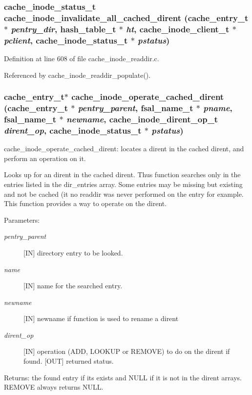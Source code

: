 \subsubsection{\setlength{\rightskip}{0pt plus 5cm}cache\_\-inode\_\-status\_\-t cache\_\-inode\_\-invalidate\_\-all\_\-cached\_\-dirent (cache\_\-entry\_\-t $\ast$ {\em pentry\_\-dir}, hash\_\-table\_\-t $\ast$ {\em ht}, cache\_\-inode\_\-client\_\-t $\ast$ {\em pclient}, cache\_\-inode\_\-status\_\-t $\ast$ {\em pstatus})}\label{cache__inode__readdir_8c_a2}




Definition at line 608 of file cache\_\-inode\_\-readdir.c.

Referenced by cache\_\-inode\_\-readdir\_\-populate().
\subsubsection{\setlength{\rightskip}{0pt plus 5cm}cache\_\-entry\_\-t$\ast$ cache\_\-inode\_\-operate\_\-cached\_\-dirent (cache\_\-entry\_\-t $\ast$ {\em pentry\_\-parent}, fsal\_\-name\_\-t $\ast$ {\em pname}, fsal\_\-name\_\-t $\ast$ {\em newname}, cache\_\-inode\_\-dirent\_\-op\_\-t {\em dirent\_\-op}, cache\_\-inode\_\-status\_\-t $\ast$ {\em pstatus})}\label{cache__inode__readdir_8c_a0}


cache\_\-inode\_\-operate\_\-cached\_\-dirent: locates a dirent in the cached dirent, and perform an operation on it.

Looks up for an dirent in the cached dirent. Thus function searches only in the entries listed in the dir\_\-entries array. Some entries may be missing but existing and not be cached (it no readdir was never performed on the entry for example. This function provides a way to operate on the dirent.

\begin{Desc}
\item[Parameters:]
\begin{description}
\item[{\em pentry\_\-parent}][IN] directory entry to be looked. \item[{\em name}][IN] name for the searched entry. \item[{\em newname}][IN] newname if function is used to rename a dirent \item[{\em dirent\_\-op}][IN] operation (ADD, LOOKUP or REMOVE) to do on the dirent if found.  [OUT] returned status.\end{description}
\end{Desc}
\begin{Desc}
\item[Returns:]the found entry if its exists and NULL if it is not in the dirent arrays. REMOVE always returns NULL. \end{Desc}


